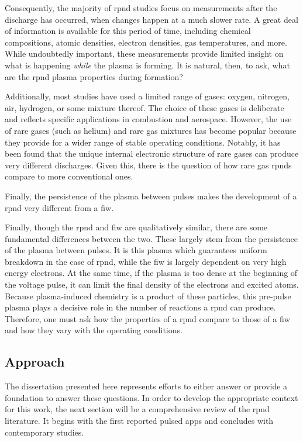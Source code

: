 Consequently, the majority of \acs{rpnd} studies focus on measurements after the
discharge has occurred, when changes happen at a much slower rate. A great deal
of information is available for this period of time, including chemical
compositions, atomic densities, electron densities, gas temperatures, and more.
While undoubtedly important, these measurements provide limited insight on what
is happening \emph{while} the plasma is forming. It is natural, then, to ask,
what are the \acs{rpnd} plasma properties during formation?

Additionally, most studies have used a limited range of gases: oxygen, nitrogen,
air, hydrogen, or some mixture thereof. The choice of these gases is deliberate
and reflects specific applications in combustion and aerospace. However, the use
of rare gases (such as helium) and rare gas mixtures has become popular because
they provide for a wider range of stable operating conditions. Notably, it has
been found that the unique internal electronic structure of rare gases can
produce very different discharges. Given this, there is the question of how rare
gas \acs{rpnd}s compare to more conventional ones.

Finally, the persistence of the plasma between pulses makes the development of a
\acs{rpnd} very different from a \acs{fiw}.

Finally, though the \acs{rpnd} and \acs{fiw} are qualitatively similar, there
are some fundamental differences between the two. These largely stem from the
persistence of the plasma between pulses. It is this plasma which guarantees
uniform breakdown in the case of \acs{rpnd}, while the \acs{fiw} is largely
dependent on very high energy electrons. At the same time, if the plasma is too
dense at the beginning of the voltage pulse, it can limit the final density of
the electrons and excited atoms. Because plasma-induced chemistry is a product
of these particles, this pre-pulse plasma plays a decisive role in the number of
reactions a \acs{rpnd} can produce. Therefore, one must ask how the properties
of a \acs{rpnd} compare to those of a \acs{fiw} and how they vary with the
operating conditions.

\subsection{Approach}

The dissertation presented here represents efforts to either answer or provide a
foundation to answer these questions. In order to develop the appropriate
context for this work, the next section will be a comprehensive review of the
\acs{rpnd} literature. It begins with the first reported pulsed \acs{app}s and
concludes with contemporary studies.

